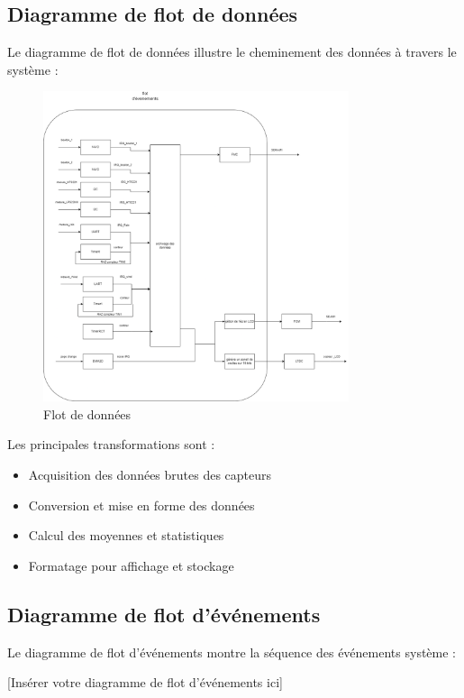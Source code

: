 \documentclass[12pt]{article}
\begin{document}
\subsection{Diagramme de flot de données}
Le diagramme de flot de données illustre le cheminement des données à travers le système :

\begin{figure}[H]
    \capstart
    \centering
    \includegraphics[width=0.8\textwidth]{./images/flot_de_donnees.drawio.png}
    \caption{Flot de données}
    \label{fig:flot_de_donnees}
\end{figure}

Les principales transformations sont :
\begin{itemize}
    \item Acquisition des données brutes des capteurs
    \item Conversion et mise en forme des données
    \item Calcul des moyennes et statistiques
    \item Formatage pour affichage et stockage
\end{itemize}

\subsection{Diagramme de flot d'événements}
Le diagramme de flot d'événements montre la séquence des événements système :

[Insérer votre diagramme de flot d'événements ici]
\end{document}

